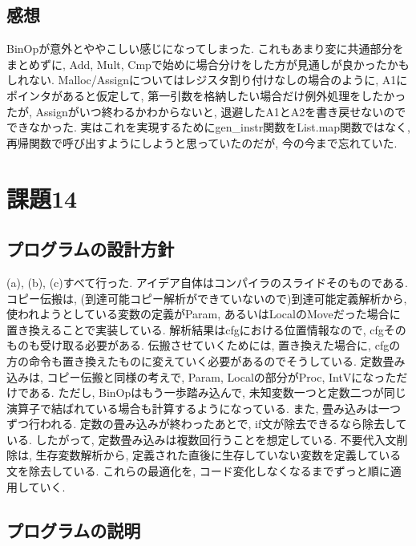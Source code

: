 \documentclass{jarticle}
\begin{document}
\subsection{感想}
BinOpが意外とややこしい感じになってしまった. これもあまり変に共通部分をまとめずに, Add, Mult, Cmpで始めに場合分けをした方が見通しが良かったかもしれない. Malloc/Assignについてはレジスタ割り付けなしの場合のように, A1にポインタがあると仮定して, 第一引数を格納したい場合だけ例外処理をしたかったが, Assignがいつ終わるかわからないと, 退避したA1とA2を書き戻せないのでできなかった. 実はこれを実現するためにgen\_instr関数をList.map関数ではなく, 再帰関数で呼び出すようにしようと思っていたのだが, 今の今まで忘れていた.


\section{課題14}
\subsection{プログラムの設計方針}
(a), (b), (c)すべて行った. アイデア自体はコンパイラのスライドそのものである. コピー伝搬は, (到達可能コピー解析ができていないので)到達可能定義解析から, 使われようとしている変数の定義がParam, あるいはLocalのMoveだった場合に置き換えることで実装している. 解析結果はcfgにおける位置情報なので, cfgそのものも受け取る必要がある. 伝搬させていくためには, 置き換えた場合に, cfgの方の命令も置き換えたものに変えていく必要があるのでそうしている. 定数畳み込みは, コピー伝搬と同様の考えで, Param, Localの部分がProc, IntVになっただけである. ただし, BinOpはもう一歩踏み込んで, 未知変数一つと定数二つが同じ演算子で結ばれている場合も計算するようになっている. また, 畳み込みは一つずつ行われる. 定数の畳み込みが終わったあとで, if文が除去できるなら除去している. したがって, 定数畳み込みは複数回行うことを想定している. 不要代入文削除は, 生存変数解析から, 定義された直後に生存していない変数を定義している文を除去している. これらの最適化を, コード変化しなくなるまでずっと順に適用していく. 
\subsection{プログラムの説明}
\end{document}
